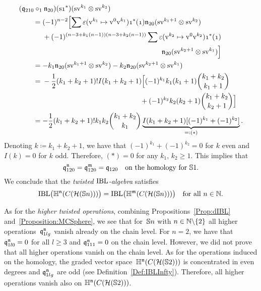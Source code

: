 \documentclass[\MainFolder/Text.tex]{subfiles}
\begin{document}
\begin{align*}
&(\OPQ_{210}\circ_1\PMC_{20})(\Susp\NOne^*)(\Susp\NVol^{k_1} \otimes \Susp\NVol^{k_2}) \\ &\qquad = \begin{multlined}[t](-1)^{n-2}\Bigl[\sum \varepsilon(\NVol^{k_1} \mapsto \NVol^0 \NVol^{k_1}) \NOne^*(\NOne) \PMC_{20}(\Susp\NVol^{k_1+1}\otimes \Susp \NVol^{k_2}) \\ {}+ (-1)^{(n-3 + k_1(n-1))(n-3 + k_2(n-1))} \sum \varepsilon(\NVol^{k_2} \mapsto \NVol^0 \NVol^{k_2})  \NOne^*(\NOne)\\ \PMC_{20}(\Susp \NVol^{k_2 + 1} \otimes\Susp\NVol^{k_1})\Bigr] \end{multlined}
\\&\qquad = -  k_1 \PMC_{20}(\Susp\NVol^{k_1+1}\otimes\Susp\NVol^{k_2}) -  k_2 \PMC_{20}(\Susp\NVol^{k_2+1}\otimes\Susp\NVol^{k_1}) \\ 
&\qquad = \begin{multlined}[t] -\frac{1}{2}(k_1+k_2+1)!I(k_1+k_2+1)\Bigl[(-1)^{k_1} k_1 (k_1+1) \binom{k_1+k_2}{k_1+1} \\ {}+ (-1)^{k_2} k_2  (k_2+1) \binom{k_1+k_2}{k_2+1}\Bigr] \end{multlined} \\ 
&\qquad =  -\frac{1}{2}(k_1+k_2+1)! k_1 k_2 \binom{k_1+k_2}{k_1} \underbrace{I(k_1 + k_2 + 1) [(-1)^{k_1} + (-1)^{k_2}]}_{=:(*)}.
\end{align*}
%
Denoting $k\coloneqq k_1 + k_2 + 1$, we have that $(-1)^{k_1} + (-1)^{k_2} = 0$ for $k$ even and $I(k) = 0$ for $k$ odd. Therefore, $(*) = 0$ for any $k_1$, $k_2\ge 1$.
This implies that 
$$ \mathfrak{q}_{120}^{\mathfrak{n}} = \mathfrak{q}_{120}^{\mathfrak{m}} = \mathfrak{q}_{120}\quad\text{on the homology for }\mathbb{S}{1}. $$
We conclude that the \emph{twisted $\mathrm{IBL}$-algebra} satisfies
$$ \mathrm{IBL}\bigl(\mathbb{H}^{\mathfrak{n}}(C(\mathcal{H}(\mathbb{S}{n})))\bigr) = \mathrm{IBL}\bigl(\mathbb{H}^{\mathfrak{m}}(C(\mathcal{H}(\mathbb{S}{n})))\bigr) \quad\text{for all }n\in \mathbb{N}. $$

As for the \emph{higher twisted operations}, combining Propositions~\ref{Prop:dIBL} and~\ref{Proposition:MCSphere}, we see that for~$\mathbb{S}{n}$ with $n\in \mathbb{N}\backslash\{2\}$ all higher operations~$\mathfrak{q}_{1lg}^{\mathfrak{n}}$ vanish already on the chain level. For $n=2$, we have that $\mathfrak{q}_{1l0}^{\mathfrak{n}} = 0$ for all $l\ge 3$ and $\mathfrak{q}_{111}^{\mathfrak{n}} = 0$ on the chain level. However, we did not prove that all higher operations vanish on the chain level. As for the operations induced on the homology, the graded vector space~$\mathbb{H}^{\mathfrak{n}}(C(\mathcal{H}(\mathbb{S}{2})))$ is concentrated in even degrees and $\mathfrak{q}_{1lg}^{\mathfrak{n}}$ are odd (see Definition~\ref{Def:IBLInfty}). Therefore, all higher operations vanish also on $\mathbb{H}^{\mathfrak{n}}(C(\mathcal{H}(\mathbb{S}{2})))$.
\end{document}
